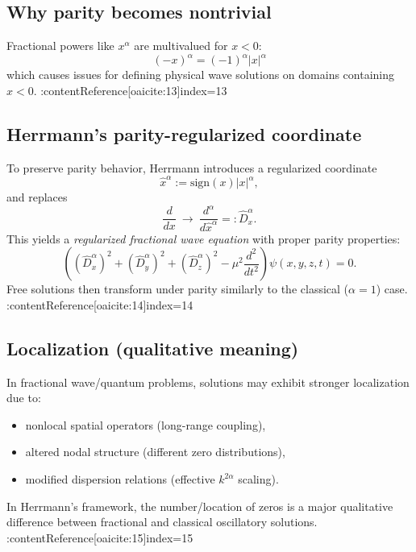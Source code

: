 \subsection{Why parity becomes nontrivial}
Fractional powers like $x^\alpha$ are multivalued for $x<0$:
\[
(-x)^\alpha = (-1)^\alpha |x|^\alpha
\]
which causes issues for defining physical wave solutions on domains containing $x<0$. :contentReference[oaicite:13]{index=13}

\subsection{Herrmann's parity-regularized coordinate}
To preserve parity behavior, Herrmann introduces a regularized coordinate
\begin{equation}
\boxed{
\hat{x}^\alpha := \mathrm{sign}(x)|x|^\alpha,
}
\end{equation}
and replaces
\begin{equation}
\boxed{
\frac{d}{dx}\ \longrightarrow\ \frac{d^\alpha}{d\hat{x}^\alpha}=: \hat{D}_x^\alpha.
}
\end{equation}
This yields a \emph{regularized fractional wave equation} with proper parity properties:
\begin{equation}
\boxed{
\left(
(\hat{D}_x^\alpha)^2+(\hat{D}_y^\alpha)^2+(\hat{D}_z^\alpha)^2
-\mu^2\frac{d^2}{dt^2}
\right)\psi(x,y,z,t)=0.
}
\end{equation}
Free solutions then transform under parity similarly to the classical ($\alpha=1$) case. :contentReference[oaicite:14]{index=14}

\subsection{Localization (qualitative meaning)}
In fractional wave/quantum problems, solutions may exhibit stronger localization due to:
\begin{itemize}
\item nonlocal spatial operators (long-range coupling),
\item altered nodal structure (different zero distributions),
\item modified dispersion relations (effective $k^{2\alpha}$ scaling).
\end{itemize}
In Herrmann's framework, the number/location of zeros is a major qualitative difference
between fractional and classical oscillatory solutions. :contentReference[oaicite:15]{index=15}


